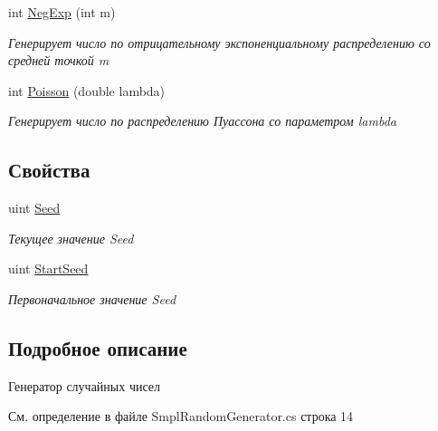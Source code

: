 \begin{DoxyCompactItemize}
int \hyperlink{class_s_m_p_l_sharp_1_1_utils_1_1_smpl_random_generator_ada324a6e67bc2efe383ac8747786cacd}{Neg\-Exp} (int m)
\begin{DoxyCompactList}\small\item\em Генерирует число по отрицательному экспоненциальному распределению со средней точкой m \end{DoxyCompactList}\item 
int \hyperlink{class_s_m_p_l_sharp_1_1_utils_1_1_smpl_random_generator_af9c5a792d8012238970623e06ccca615}{Poisson} (double lambda)
\begin{DoxyCompactList}\small\item\em Генерирует число по распределению Пуассона со параметром lambda \end{DoxyCompactList}\end{DoxyCompactItemize}
\subsection*{Свойства}
\begin{DoxyCompactItemize}
\item 
uint \hyperlink{class_s_m_p_l_sharp_1_1_utils_1_1_smpl_random_generator_a504f2e98704d7f18cfacc0d36be02eaf}{Seed}
\begin{DoxyCompactList}\small\item\em Текущее значение Seed \end{DoxyCompactList}\item 
uint \hyperlink{class_s_m_p_l_sharp_1_1_utils_1_1_smpl_random_generator_a87ae75f71d8390f0980feef6e82b7d87}{Start\-Seed}
\begin{DoxyCompactList}\small\item\em Первоначальное значение Seed \end{DoxyCompactList}\end{DoxyCompactItemize}


\subsection{Подробное описание}
Генератор случайных чисел 



См. определение в файле Smpl\-Random\-Generator.\-cs строка 14



